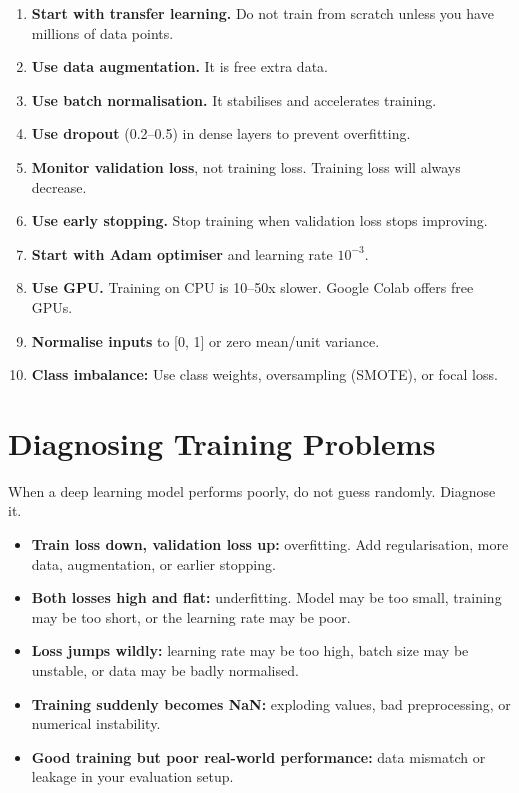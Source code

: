 \documentclass[12pt, a4paper, oneside]{book}
\begin{document}
\begin{enumerate}[leftmargin=2em]
    \item \textbf{Start with transfer learning.} Do not train from scratch unless you have millions of data points.
    \item \textbf{Use data augmentation.} It is free extra data.
    \item \textbf{Use batch normalisation.} It stabilises and accelerates training.
    \item \textbf{Use dropout} (0.2--0.5) in dense layers to prevent overfitting.
    \item \textbf{Monitor validation loss}, not training loss. Training loss will always decrease.
    \item \textbf{Use early stopping.} Stop training when validation loss stops improving.
    \item \textbf{Start with Adam optimiser} and learning rate $10^{-3}$.
    \item \textbf{Use GPU.} Training on CPU is 10--50x slower. Google Colab offers free GPUs.
    \item \textbf{Normalise inputs} to [0, 1] or zero mean/unit variance.
    \item \textbf{Class imbalance:} Use class weights, oversampling (SMOTE), or focal loss.
\end{enumerate}

\section{Diagnosing Training Problems}

When a deep learning model performs poorly, do not guess randomly. Diagnose it.

\begin{itemize}[leftmargin=2em]
    \item \textbf{Train loss down, validation loss up:} overfitting. Add regularisation, more data, augmentation, or earlier stopping.
    \item \textbf{Both losses high and flat:} underfitting. Model may be too small, training may be too short, or the learning rate may be poor.
    \item \textbf{Loss jumps wildly:} learning rate may be too high, batch size may be unstable, or data may be badly normalised.
    \item \textbf{Training suddenly becomes NaN:} exploding values, bad preprocessing, or numerical instability.
    \item \textbf{Good training but poor real-world performance:} data mismatch or leakage in your evaluation setup.
\end{itemize}
\end{document}
